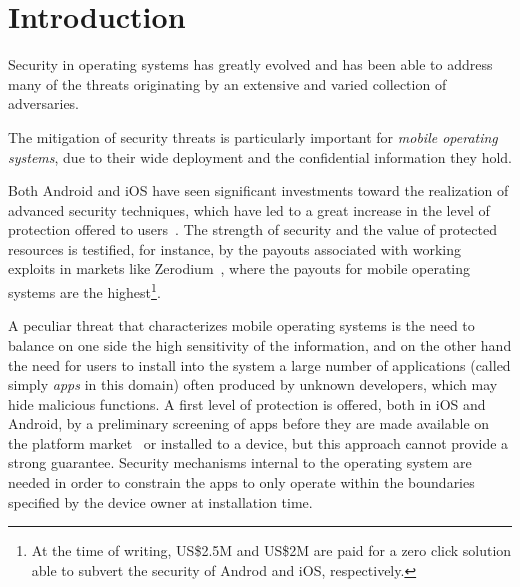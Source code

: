 \section{Introduction}
\label{sect:seapp_introduction}

Security in operating systems has greatly evolved and has been able to
address many of the threats originating by an extensive and varied
collection of adversaries.

The mitigation of security threats is particularly important
for {\em mobile operating systems}, due to their wide deployment and
the confidential information they hold.

Both Android and iOS have seen significant investments toward the
realization of advanced security techniques, which have led to a great
increase in the level of protection offered to
users~\cite{seapp_tapsm_m}.  The strength of security and the value of
protected resources is testified, for instance, by the payouts
associated with working exploits in markets like
Zerodium~\cite{seapp_zerodium}, where the payouts for mobile operating
systems are the highest\footnote{At the time of writing, US\$2.5M and
  US\$2M are paid for a zero click solution able to subvert the
  security of Androd and iOS, respectively. }.

A peculiar threat that characterizes mobile operating systems is the
need to balance on one side the high sensitivity of the information,
and on the other hand the need for users to install into the system a
large number of applications (called simply {\em apps} in this domain)
often produced by unknown developers, which may hide malicious
functions.  A first level of protection is offered, both in iOS and
Android, by a preliminary screening of apps before they are made
available on the platform market~\cite{seapp_playprotect} or installed
to a device, but this approach cannot provide a strong guarantee.
Security mechanisms internal to the operating system are needed in
order to constrain the apps to only operate within the boundaries
specified by the device owner at installation time.

